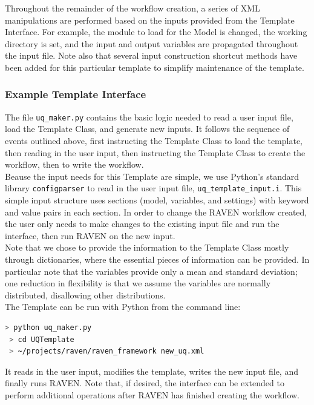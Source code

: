 Throughout the remainder of the workflow creation, a series of XML manipulations are performed based on the inputs provided from the Template Interface. For example, the module to load for the Model is changed, the working directory is set, and the input and output variables are propagated throughout the input file. Note also that several input construction shortcut methods have been added for this particular template to simplify maintenance of the template.


\subsubsection{Example Template Interface}
The file \texttt{uq\_maker.py} contains the basic logic needed to read a user input file, load the Template Class, and generate new inputs. It follows the sequence of events outlined above, first instructing the Template Class to load the template, then reading in the user input, then instructing the Template Class to create the workflow, then to write the workflow.
\\

Beause the input needs for this Template are simple, we use Python's standard library \texttt{configparser} to read in the user input file, \texttt{uq\_template\_input.i}. This simple input structure uses sections (model, variables, and settings) with keyword and value pairs in each section. In order to change the RAVEN workflow created, the user only needs to make changes to the existing input file and run the interface, then run RAVEN on the new input.
\\

Note that we chose to provide the information to the Template Class mostly through dictionaries, where the essential pieces of information can be provided. In particular note that the variables provide only a mean and standard deviation; one reduction in flexibility is that we assume the variables are normally distributed, disallowing other distributions.
\\

The Template can be run with Python from the command line:
\begin{lstlisting}[language=bash]
 > python uq_maker.py
 > cd UQTemplate
 > ~/projects/raven/raven_framework new_uq.xml
\end{lstlisting}
It reads in the user input, modifies the template, writes the new input file, and finally runs RAVEN. Note that, if desired, the interface can be extended to perform additional operations after RAVEN has finished creating the workflow.
